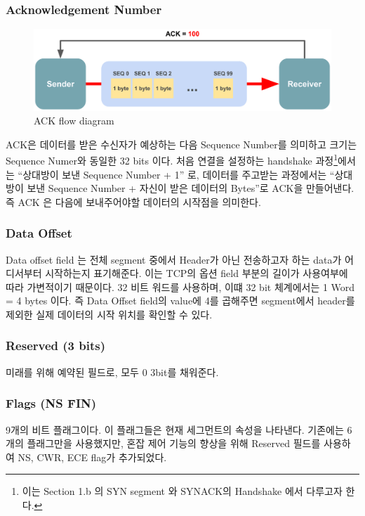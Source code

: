     \subsubsection*{Acknowledgement Number}
        \vspace{-4mm}  
        \begin{figure}[!h]\centering
    		\includegraphics[width=.7\textwidth]{image/week01/1-3.png}
    		\caption{\small ACK flow diagram}
    		\vspace{-10pt}
        \end{figure}
    	ACK은 데이터를 받은 수신자가 예상하는 다음 Sequence Number를 의미하고 크기는 Sequence Numer와 동일한 32 bits 이다. 
    	처음 연결을 설정하는 handshake 과정\footnote{이는 Section 1.b 의 SYN segment 와 SYNACK의 Handshake 에서 다루고자 한다. }에서는 “상대방이 보낸 Sequence Number + 1” 로, 데이터를 주고받는 과정에서는 “상대방이 보낸 Sequence Number + 자신이 받은 데이터의 Bytes”로 ACK을 만들어낸다.
    	즉 ACK 은 다음에 보내주어야할 데이터의 시작점을 의미한다. 
    \subsubsection*{Data Offset}\label{sec:data offset}
        Data offset field 는 전체 segment 중에서 Header가 아닌 전송하고자 하는 data가 어디서부터 시작하는지 표기해준다. 
        이는 TCP의 옵션 field 부분의 길이가 사용여부에 따라 가변적이기 때문이다. 
        32 비트 워드를 사용하며, 이떄 32 bit 체계에서는 1 Word = 4 bytes 이다. 
        즉 Data Offset field의 value에 4를 곱해주면 segment에서 header를 제외한 실제 데이터의 시작 위치를  확인할 수 있다.
    \subsubsection*{Reserved (3 bits)}\label{sec:reserved}
        미래를 위해 예약된 필드로, 모두 0 3bit를 채워준다.
    \subsubsection*{Flags (NS \~ FIN)}   
        9개의 비트 플래그이다. 이 플래그들은 현재 세그먼트의 속성을 나타낸다. 기존에는 6개의 플래그만을 사용했지만, 혼잡 제어 기능의 향상을 위해 Reserved 필드를 사용하여 NS, CWR, ECE flag가 추가되었다.
        
